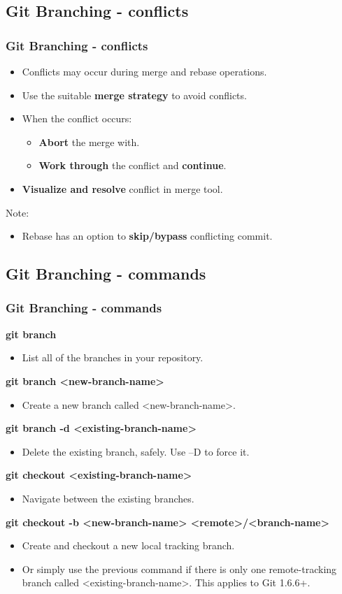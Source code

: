 \subsection[]{Git Branching - conflicts}
\begin{frame}
\frametitle{Git Branching - conflicts}
\begin{itemize}
	\item Conflicts may occur during merge and rebase operations.
	\item Use the suitable \textbf{merge strategy} to avoid conflicts.
	\item When the conflict occurs:
		\begin{itemize}
		\item \textbf{Abort} the merge with.
		\item \textbf{Work through} the conflict and \textbf{continue}.
		\end{itemize}
	\item \textbf{Visualize and resolve} conflict in merge tool.
\end{itemize}
Note:
\begin{itemize}
	\item Rebase has an option to \textbf{skip/bypass} conflicting commit.
\end{itemize}
\end{frame}

\subsection[]{Git Branching - commands}
\begin{frame}
\frametitle{Git Branching - commands}
\textbf{git branch}
	\begin{itemize}
	\item List all of the branches in your repository.
	\end{itemize}
\textbf{git branch <new-branch-name>}
	\begin{itemize}
	\item Create a new branch called <new-branch-name>.
	\end{itemize}
\textbf{git branch -d <existing-branch-name>}
	\begin{itemize}
	\item Delete the existing branch, safely. Use –D to force it.
	\end{itemize}
\textbf{git checkout <existing-branch-name>}
	\begin{itemize}
	\item Navigate between the existing branches.
	\end{itemize}
\textbf{git checkout -b <new-branch-name> <remote>/<branch-name>}
	\begin{itemize}
	\item Create and checkout a new local tracking branch.
	\item Or simply use the previous command if there is only one remote-tracking branch called <existing-branch-name>. This applies to Git 1.6.6+. 
	\end{itemize}
\end{frame}


